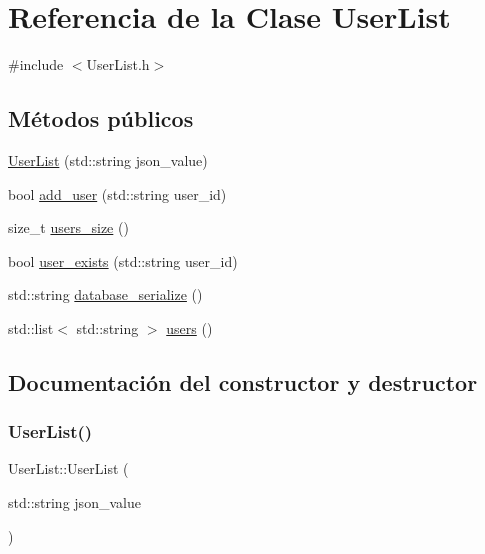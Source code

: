\hypertarget{classUserList}{}\section{Referencia de la Clase User\+List}
\label{classUserList}


{\ttfamily \#include $<$User\+List.\+h$>$}

\subsection*{Métodos públicos}
\begin{DoxyCompactItemize}
\item 
\hyperlink{classUserList_a0b25ea178578b663b0e89069ad1621c8}{User\+List} (std\+::string json\+\_\+value)
\item 
bool \hyperlink{classUserList_a05ea1e97481b354b09fc7b2d958ab3f0}{add\+\_\+user} (std\+::string user\+\_\+id)
\item 
size\+\_\+t \hyperlink{classUserList_a4aad4620f110a864907fbf6fc5052ca1}{users\+\_\+size} ()
\item 
bool \hyperlink{classUserList_af0915199f9d94fdbb2d977d1641338e2}{user\+\_\+exists} (std\+::string user\+\_\+id)
\item 
std\+::string \hyperlink{classUserList_ab65c0e619e9c870f58a8b5cb91cd9bdf}{database\+\_\+serialize} ()
\item 
std\+::list$<$ std\+::string $>$ \hyperlink{classUserList_a23770ac7a1e27d45d6cb738df1a66285}{users} ()
\end{DoxyCompactItemize}


\subsection{Documentación del constructor y destructor}
\mbox{\label{classUserList_a0b25ea178578b663b0e89069ad1621c8}} 
\subsubsection{\texorpdfstring{User\+List()}{UserList()}}
{\footnotesize\ttfamily User\+List\+::\+User\+List (\begin{DoxyParamCaption}\item[{std\+::string}]{json\+\_\+value }\end{DoxyParamCaption})}



